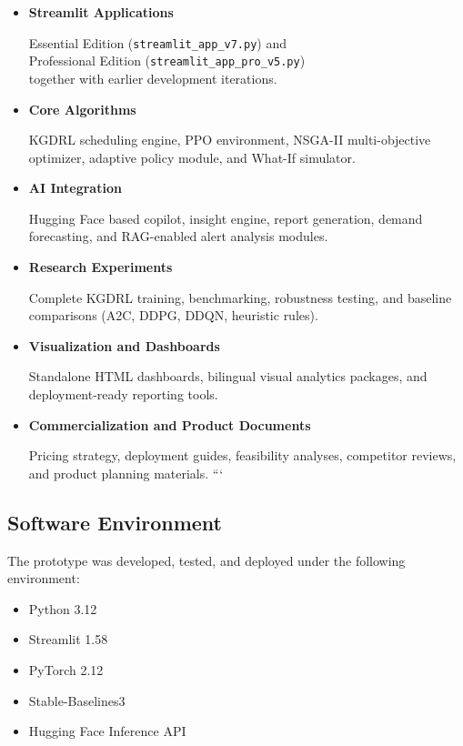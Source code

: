 \begin{itemize}
\item \textbf{Streamlit Applications}

Essential Edition (\texttt{streamlit\_app\_v7.py}) and \\ Professional Edition (\texttt{streamlit\_app\_pro\_v5.py}) \\ together with earlier development iterations.

\item \textbf{Core Algorithms}

KGDRL scheduling engine, PPO environment, NSGA-II multi-objective optimizer, adaptive policy module, and What-If simulator.

\item \textbf{AI Integration}

Hugging Face based copilot, insight engine, report generation, demand forecasting, and RAG-enabled alert analysis modules.

\item \textbf{Research Experiments}

Complete KGDRL training, benchmarking, robustness testing, and baseline comparisons (A2C, DDPG, DDQN, heuristic rules).

\item \textbf{Visualization and Dashboards}

Standalone HTML dashboards, bilingual visual analytics packages, and deployment-ready reporting tools.

\item \textbf{Commercialization and Product Documents}

Pricing strategy, deployment guides, feasibility analyses, competitor reviews, and product planning materials.
```

\end{itemize}

\subsection{Software Environment}

The prototype was developed, tested, and deployed under the following environment:

\begin{itemize}
\item Python 3.12
\item Streamlit 1.58
\item PyTorch 2.12
\item Stable-Baselines3
\item Hugging Face Inference API
\end{itemize}

